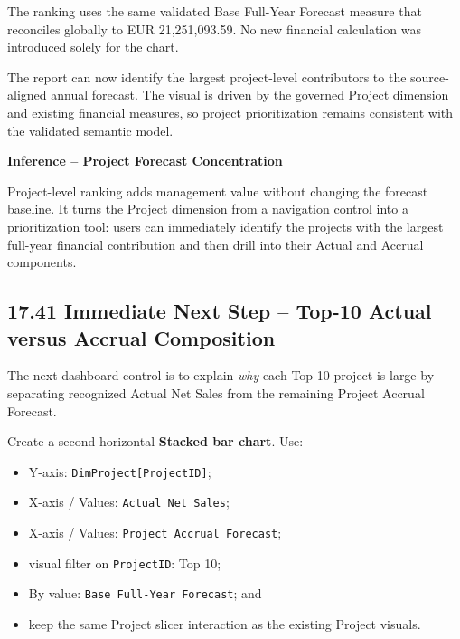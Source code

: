 \documentclass[11pt,a4paper]{article}
\begin{document}
The ranking uses the same validated Base Full-Year Forecast measure that
reconciles globally to EUR 21,251,093.59. No new financial calculation was
introduced solely for the chart.

\begin{successbox}

\textbf{\color{SuccessGreen}{Top-10 Project Ranking Result}}

The report can now identify the largest project-level contributors to the
source-aligned annual forecast. The visual is driven by the governed Project
dimension and existing financial measures, so project prioritization remains
consistent with the validated semantic model.

\end{successbox}

\begin{inferencebox}

\textbf{Inference -- Project Forecast Concentration}

Project-level ranking adds management value without changing the forecast
baseline. It turns the Project dimension from a navigation control into a
prioritization tool: users can immediately identify the projects with the
largest full-year financial contribution and then drill into their Actual and
Accrual components.

\end{inferencebox}

\subsection{17.41 Immediate Next Step -- Top-10 Actual versus Accrual Composition}

The next dashboard control is to explain \emph{why} each Top-10 project is large
by separating recognized Actual Net Sales from the remaining Project Accrual
Forecast.

Create a second horizontal \textbf{Stacked bar chart}. Use:

\begin{itemize}[leftmargin=7mm,itemsep=2pt]
    \item Y-axis: \texttt{DimProject[ProjectID]};
    \item X-axis / Values: \texttt{Actual Net Sales};
    \item X-axis / Values: \texttt{Project Accrual Forecast};
    \item visual filter on \texttt{ProjectID}: Top 10;
    \item By value: \texttt{Base Full-Year Forecast}; and
    \item keep the same Project slicer interaction as the existing Project visuals.
\end{itemize}
\end{document}
